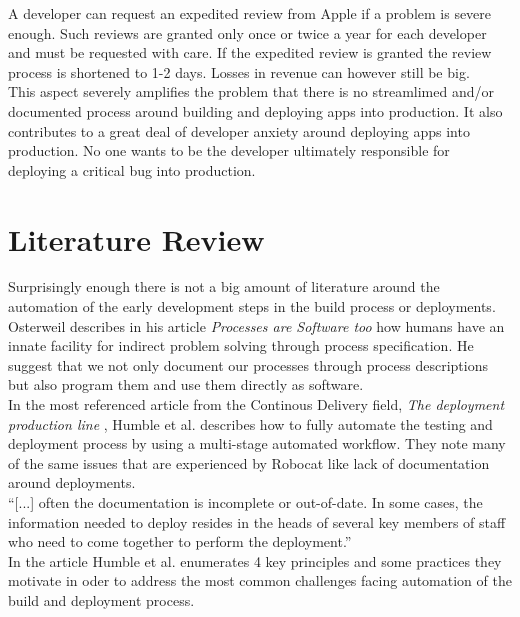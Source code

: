 \documentclass{ituthesis}
\begin{document}
A developer can request an expedited review from Apple if a problem is severe enough. Such reviews are granted only once or twice a year for each developer and must be requested with care. If the expedited review is granted the review process is shortened to 1-2 days. Losses in revenue can however still be big.\\

This aspect severely amplifies the problem that there is no streamlimed and/or documented process around building and deploying apps into production. It also contributes to a great deal of developer anxiety around deploying apps into production. No one wants to be the developer ultimately responsible for deploying a critical bug into production.

\chapter{Literature Review}
\label{ch:literature_review}

Surprisingly enough there is not a big amount of literature around the automation of the early development steps in the build process or deployments.\\

Osterweil \cite{Osterweil1997} describes in his article \textit{Processes are Software too} how humans have an innate facility for indirect problem solving through process specification. He suggest that we not only document our processes through process descriptions but also program them and use them directly as software.\\

In the most referenced article from the Continous Delivery field, \textit{The deployment production line} \cite{Humble2006}, Humble et al. describes how to fully automate the testing and deployment process by using a multi-stage automated workflow. They note many of the same issues that are experienced by Robocat like lack of documentation around deployments.\\

``[...] often the documentation is incomplete or out-of-date. In some cases, the information needed to deploy resides in the heads of several key members of staff who need to come together to perform the deployment.'' \cite{Humble2006}\\

In the article Humble et al. enumerates 4 key principles and some practices they motivate in oder to address the most common challenges facing automation of the build and deployment process.\\
\end{document}
